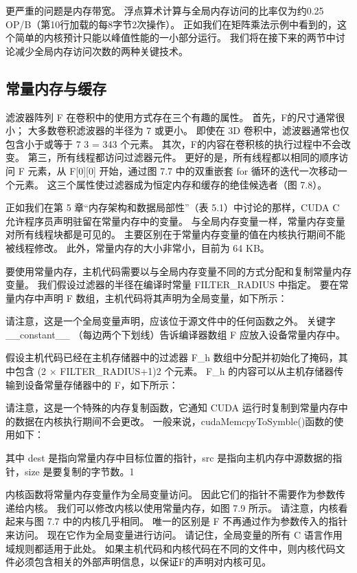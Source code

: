 更严重的问题是内存带宽。 浮点算术计算与全局内存访问的比率仅为约0.25 OP/B（第10行加载的每8字节2次操作）。 正如我们在矩阵乘法示例中看到的，这个简单的内核预计只能以峰值性能的一小部分运行。 我们将在接下来的两节中讨论减少全局内存访问次数的两种关键技术。

\subsection{常量内存与缓存}
滤波器阵列 F 在卷积中的使用方式存在三个有趣的属性。 首先，F的尺寸通常很小； 大多数卷积滤波器的半径为 7 或更小。 即使在 3D 卷积中，滤波器通常也仅包含小于或等于 7 3 = 343 个元素。 其次，F的内容在卷积核的执行过程中不会改变。 第三，所有线程都访问过滤器元件。 更好的是，所有线程都以相同的顺序访问 F 元素，从 F[0][0] 开始，通过图 7.7 中的双重嵌套 for 循环的迭代一次移动一个元素。 这三个属性使过滤器成为恒定内存和缓存的绝佳候选者（图 7.8）。

正如我们在第 5 章“内存架构和数据局部性”（表 5.1）中讨论的那样，CUDA C 允许程序员声明驻留在常量内存中的变量。 与全局内存变量一样，常量内存变量对所有线程块都是可见的。 主要区别在于常量内存变量的值在内核执行期间不能被线程修改。 此外，常量内存的大小非常小，目前为 64 KB。

要使用常量内存，主机代码需要以与全局内存变量不同的方式分配和复制常量内存变量。 我们假设过滤器的半径在编译时常量 FILTER\_RADIUS 中指定。 要在常量内存中声明 F 数组，主机代码将其声明为全局变量，如下所示：

请注意，这是一个全局变量声明，应该位于源文件中的任何函数之外。 关键字 \_\_constant\_\_ （每边两个下划线）告诉编译器数组 F 应放入设备常量内存中。

假设主机代码已经在主机存储器中的过滤器 F\_h 数组中分配并初始化了掩码，其中包含 (2 × FILTER\_RADIUS+1)2 个元素。 F\_h 的内容可以从主机存储器传输到设备常量存储器中的 F，如下所示：

请注意，这是一个特殊的内存复制函数，它通知 CUDA 运行时复制到常量内存中的数据在内核执行期间不会更改。 一般来说，cudaMemcpyToSymble()函数的使用如下：

其中 dest 是指向常量内存中目标位置的指针，src 是指向主机内存中源数据的指针，size 是要复制的字节数。1

内核函数将常量内存变量作为全局变量访问。 因此它们的指针不需要作为参数传递给内核。 我们可以修改内核以使用常量内存，如图 7.9 所示。 请注意，内核看起来与图 7.7 中的内核几乎相同。 唯一的区别是 F 不再通过作为参数传入的指针来访问。 现在它作为全局变量进行访问。 请记住，全局变量的所有 C 语言作用域规则都适用于此处。 如果主机代码和内核代码在不同的文件中，则内核代码文件必须包含相关的外部声明信息，以保证F的声明对内核可见。

